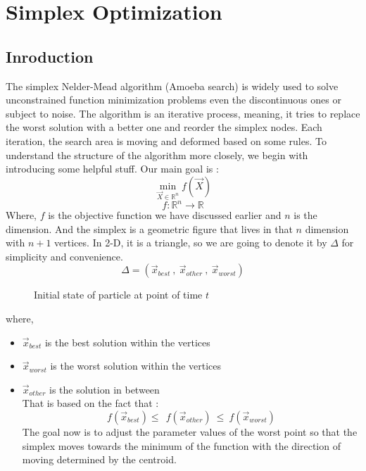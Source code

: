 
\large

\chapter*{Simplex Optimization}

\section{Inroduction}
The simplex Nelder-Mead algorithm (Amoeba search) is widely used to
solve unconstrained function minimization problems even the
discontinuous ones or subject to noise. The algorithm is an iterative
process, meaning, it tries to replace the worst solution with a better
one and reorder the simplex nodes. Each iteration, the search area is
moving and deformed based on some rules. To understand the structure of
the algorithm more closely, we begin with introducing some helpful
stuff. Our main goal is :
{\[\min\limits_{\overset{\rightarrow}{X} \in \mathbb{R}^{n}}{f(\overset{\rightarrow}{X})}\]}{\[f:\mathbb{R}^{n}\rightarrow\mathbb{R}\]}Where,
{\(f\)} is the objective function we have discussed earlier and {\(n\)}
is the dimension. And the simplex is a geometric figure that lives in
that {\(n\)} dimension with {\(n + 1\)} vertices. In 2-D, it is a
triangle, so we are going to denote it by {\(\Delta\)} for simplicity
and convenience.
{\[\Delta = ({\overset{\rightarrow}{x}}_{best}\ ,\ {\overset{\rightarrow}{x}}_{other}\ ,\ {\overset{\rightarrow}{x}}_{worst})\]}
\begin{figure}[htbp]
        \centering
        \scalebox{1.1}{}
        \caption{Initial state of particle at point of time $t$ }
        \label{fig:label}
    \end{figure}

where,

\begin{itemize}
\item
  {\({\overset{\rightarrow}{x}}_{best}\)} is the best solution within
  the vertices
\item
  {\({\overset{\rightarrow}{x}}_{worst}\)} is the worst solution within
  the vertices
\item
  {\({\overset{\rightarrow}{x}}_{other}\)} is the solution in between\\
  That is based on the fact that :\\
  {\[f({\overset{\rightarrow}{x}}_{best}) \leq \ \ f({\overset{\rightarrow}{x}}_{other})\  \leq \ f({\overset{\rightarrow}{x}}_{worst})\]}The
  goal now is to adjust the parameter values of the worst point so that
  the simplex moves towards the minimum of the function with the
  direction of moving determined by the centroid.
\end{itemize}

